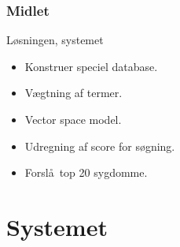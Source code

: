\documentclass[xcolor=table]{beamer}
\begin{document}
\begin{frame}
\begin{scriptsize}
{\begin{tabular}{| p{5cm} | p{5cm} |}
          \hline
          
        \end{tabular}
        
      }

  \end{scriptsize}

  \hspace*{4mm}


  \hspace*{4mm}


\end{frame}

\begin{frame}

  \frametitle{Midlet}

  \begin{block}{L\o sningen, systemet}

    \begin{itemize}

      \item Konstruer speciel database.
      \item V\ae gtning af termer.
      \item Vector space model.
      \item Udregning af score for s\o gning.
      \item Forsl\aa\ top 20 sygdomme.

    \end{itemize}

  \end{block}

\end{frame}

\section{Systemet}

\subsection*{}
\end{document}
